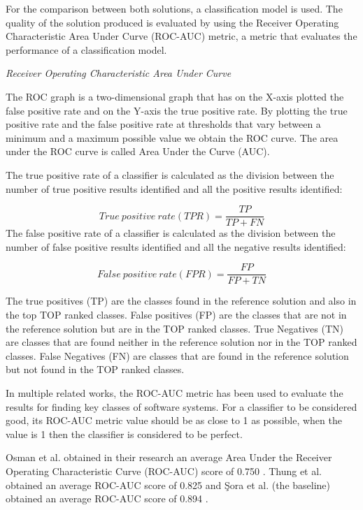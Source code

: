 \documentclass[runningheads]{comsis2}
\begin{document}
For the comparison between both solutions, a classification model is used. The quality of the solution produced is evaluated by using the Receiver Operating Characteristic Area Under Curve (ROC-AUC) metric, a metric that evaluates the performance of a classification model.


\textit{Receiver Operating Characteristic Area Under Curve}


The ROC graph is a two-dimensional graph that has on the X-axis plotted the false positive rate and on the Y-axis the true positive rate. By plotting the true positive rate and the false positive rate at thresholds that vary between a minimum and a maximum possible value we obtain the ROC curve. The area under the ROC curve is called Area Under the Curve (AUC).

The true positive rate of a classifier is calculated as the division between the number of true positive results identified and all the positive results identified:

\begin{equation}
 True\ positive\ rate (TPR) = \frac{TP}{TP+FN}
\end{equation}
The false positive rate of a classifier is calculated as the division between the number of false positive results identified and all the negative results identified:

\begin{equation}
 False\ positive\ rate (FPR) = \frac{FP}{FP+TN}
\end{equation}

The true positives (TP) are the classes found in the reference solution and also in the top TOP ranked classes. False positives (FP) are the classes that are not in the reference solution but are in the TOP ranked classes.
True Negatives (TN) are classes that are found neither in the reference solution nor in the TOP ranked classes. False Negatives (FN) are classes that are found in the reference solution but not found in the TOP ranked classes.

In multiple related works, the ROC-AUC metric has been used to evaluate the results for finding key classes of software systems.
For a classifier to be considered good, its ROC-AUC metric value should be as close to 1 as possible, when the value is 1 then the classifier is considered to be perfect.

Osman et al. obtained in their research an average Area Under the Receiver Operating Characteristic Curve (ROC-AUC) score of 0.750 \cite{6676885}. Thung et al. obtained an average ROC-AUC score of 0.825 \cite{rocclasification}  and Şora et al. (the baseline) obtained an average ROC-AUC score of 0.894 \cite{Finding-key-classes}.
\end{document}
